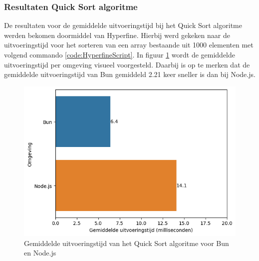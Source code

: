 \subsubsection{Resultaten  Quick Sort algoritme}
De resultaten voor de gemiddelde uitvoeringstijd bij het Quick Sort algoritme werden bekomen doormiddel van Hyperfine.
Hierbij werd gekeken naar de uitvoeringstijd voor het sorteren van een array bestaande uit 1000 elementen met volgend commando \ref{code:HyperfineScript}.
In figuur \ref{fig:uitvoeringstijdscript} wordt de gemiddelde uitvoeringstijd per omgeving visueel voorgesteld. 
Daarbij is op te merken dat de gemiddelde uitvoeringstijd van Bun gemiddeld 2.21 keer sneller is dan bij Node.js.
\begin{figure}[H]
  \centering
  \includegraphics{graphics/scriptuitvoeringstijd.png}
  \caption{\label{fig:uitvoeringstijdscript}Gemiddelde uitvoeringstijd van het Quick Sort algoritme voor Bun en Node.js}
\end{figure}

